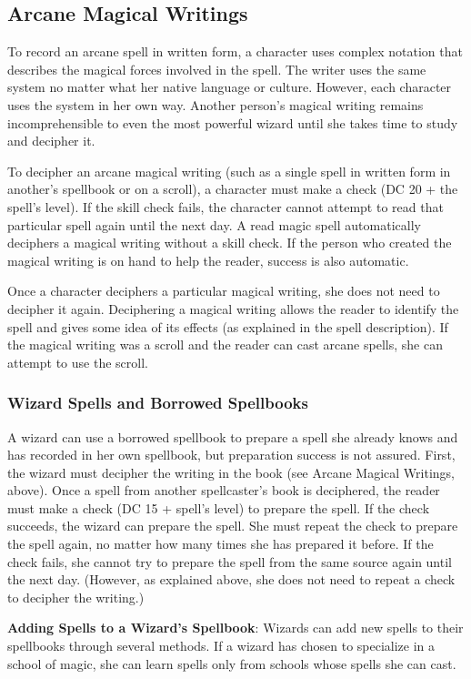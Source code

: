 \subsection{Arcane Magical Writings}
To record an arcane spell in written form, a character uses complex notation that describes the magical forces involved in the spell. The writer uses the same system no matter what her native language or culture. However, each character uses the system in her own way. Another person's magical writing remains incomprehensible to even the most powerful wizard until she takes time to study and decipher it.

To decipher an arcane magical writing (such as a single spell in written form in another's spellbook or on a scroll), a character must make a  check (DC 20 + the spell's level). If the skill check fails, the character cannot attempt to read that particular spell again until the next day. A read magic spell automatically deciphers a magical writing without a skill check. If the person who created the magical writing is on hand to help the reader, success is also automatic.

Once a character deciphers a particular magical writing, she does not need to decipher it again. Deciphering a magical writing allows the reader to identify the spell and gives some idea of its effects (as explained in the spell description). If the magical writing was a scroll and the reader can cast arcane spells, she can attempt to use the scroll.

\subsubsection{Wizard Spells and Borrowed Spellbooks}
A wizard can use a borrowed spellbook to prepare a spell she already knows and has recorded in her own spellbook, but preparation success is not assured. First, the wizard must decipher the writing in the book (see Arcane Magical Writings, above). Once a spell from another spellcaster's book is deciphered, the reader must make a  check (DC 15 + spell's level) to prepare the spell. If the check succeeds, the wizard can prepare the spell. She must repeat the check to prepare the spell again, no matter how many times she has prepared it before. If the check fails, she cannot try to prepare the spell from the same source again until the next day. (However, as explained above, she does not need to repeat a check to decipher the writing.)

\textbf{Adding Spells to a Wizard's Spellbook}: Wizards can add new spells to their spellbooks through several methods. If a wizard has chosen to specialize in a school of magic, she can learn spells only from schools whose spells she can cast.

